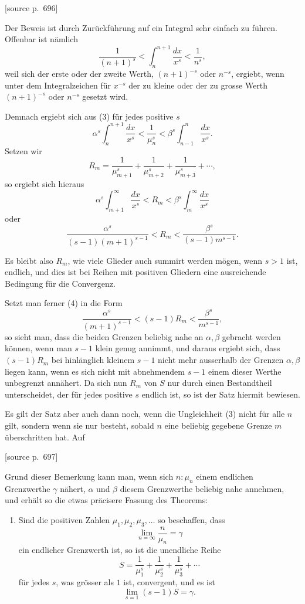 \documentclass[11pt]{article}
\newcommand{\srcpage}[1]{\par\medskip\noindent\textsf{[source p.~#1]}\par\smallskip}
\begin{document}
\srcpage{696}
Der Beweis ist durch Zurückführung auf ein Integral sehr einfach zu führen. Offenbar ist nämlich
\[
\frac1{(n+1)^s}<\int_n^{n+1}\frac{dx}{x^s}<\frac1{n^s},
\]
weil sich der erste oder der zweite Werth, $(n+1)^{-s}$ oder $n^{-s}$, ergiebt, wenn unter dem Integralzeichen für $x^{-s}$ der zu kleine oder der zu grosse Werth $(n+1)^{-s}$ oder $n^{-s}$ gesetzt wird.

Demnach ergiebt sich aus (3) für jedes positive $s$
\[
\alpha^s\int_n^{n+1}\frac{dx}{x^s}<\frac1{\mu_n^s}<\beta^s\int_{n-1}^{n}\frac{dx}{x^s}.
\]
Setzen wir
\[
R_m=\frac1{\mu_{m+1}^s}+\frac1{\mu_{m+2}^s}+\frac1{\mu_{m+3}^s}+\cdots,
\]
so ergiebt sich hieraus
\[
\alpha^s\int_{m+1}^{\infty}\frac{dx}{x^s}<R_m<\beta^s\int_m^{\infty}\frac{dx}{x^s}
\]
oder
\begin{equation}
\frac{\alpha^s}{(s-1)(m+1)^{s-1}}<R_m<\frac{\beta^s}{(s-1)m^{s-1}} .
\tag{4}
\end{equation}

Es bleibt also $R_m$, wie viele Glieder auch summirt werden mögen, wenn $s>1$ ist, endlich, und dies ist bei Reihen mit positiven Gliedern eine ausreichende Bedingung für die Convergenz.

Setzt man ferner (4) in die Form
\[
\frac{\alpha^s}{(m+1)^{s-1}}<(s-1)R_m<\frac{\beta^s}{m^{s-1}},
\]
so sieht man, dass die beiden Grenzen beliebig nahe an $\alpha,\beta$ gebracht werden können, wenn man $s-1$ klein genug annimmt, und daraus ergiebt sich, dass $(s-1)R_m$ bei hinlänglich kleinem $s-1$ nicht mehr ausserhalb der Grenzen $\alpha,\beta$ liegen kann, wenn es sich nicht mit abnehmendem $s-1$ einem dieser Werthe unbegrenzt annähert. Da sich nun $R_m$ von $S$ nur durch einen Bestandtheil unterscheidet, der für jedes positive $s$ endlich ist, so ist der Satz hiermit bewiesen.

Es gilt der Satz aber auch dann noch, wenn die Ungleichheit (3) nicht für alle $n$ gilt, sondern wenn sie nur besteht, sobald $n$ eine beliebig gegebene Grenze $m$ überschritten hat. Auf

\srcpage{697}
Grund dieser Bemerkung kann man, wenn sich $n:\mu_n$ einem endlichen Grenzwerthe $\gamma$ nähert, $\alpha$ und $\beta$ diesem Grenzwerthe beliebig nahe annehmen, und erhält so die etwas präcisere Fassung des Theorems:

\begin{enumerate}[label=\textbf{\arabic*.},leftmargin=2.2em,start=3]
\item Sind die positiven Zahlen $\mu_1,\mu_2,\mu_3,\ldots$ so beschaffen, dass
\[
\lim_{n=\infty}\frac{n}{\mu_n}=\gamma
\]
ein endlicher Grenzwerth ist, so ist die unendliche Reihe
\[
S=\frac1{\mu_1^s}+\frac1{\mu_2^s}+\frac1{\mu_3^s}+\cdots
\]
für jedes $s$, was grösser als $1$ ist, convergent, und es ist
\[
\lim_{s=1}(s-1)S=\gamma.
\]
\end{enumerate}
\end{document}
